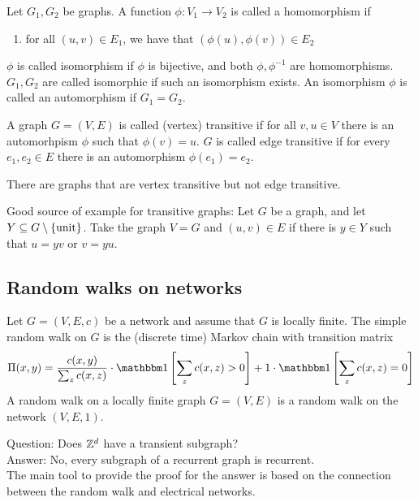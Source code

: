 \begin{defn}[Homomorphisms]
    Let $G_1,G_2$ be graphs. A function \(\phi: V_1 \to V_2\) is called a homomorphism if 
    \begin{enumerate}
      \item for all $(u,v) \in E_1$, we have that \((\phi(u), \phi(v)) \in E_2\)
    \end{enumerate}
    $\phi$ is called isomorphism if \(\phi\) is bijective, and both $\phi,\phi^{-1}$ are homomorphisms. $G_1,G_2$ are called isomorphic if such an isomorphism exists. An isomorphism $\phi$ is called an automorphism if $G_1=G_2$.
\end{defn}

\begin{defn}[Transitivity]
    A graph $G=(V,E)$ is called (vertex) transitive if for all \(v,u\in V\) there is an automorhpism \(\phi\) such that \(\phi(v)=u\). $G$ is called edge transitive if for every $e_1,e_2 \in E$ there is an automorphism $\phi(e_1)=e_2$.
\end{defn}

\begin{remark}
    There are graphs that are vertex transitive but not edge transitive.
\end{remark}

\begin{remark}
  Good source of example for transitive graphs: Let $G$ be a graph, and let $Y \subseteq G\setminus\left\{ {\textrm{unit}} \right\}$. Take the graph $V=G$ and $(u,v) \in E$ if there is $y\in Y$ such that $u=yv$ or $v=yu$.
\end{remark}


\subsection{Random walks on networks}

\begin{defn}
Let $G=(V,E,c)$ be a network and assume that $G$ is locally finite. The simple random walk on $G$ is the (discrete time) Markov chain with transition matrix
\[\Pi(x,y) = \frac{c(x,y)}{\sum_z c(x,z)} \cdot \ONE\left[\sum_z c(x,z) >0\right] + 1 \cdot \ONE\left[\sum_z c(x,z)=0\right] \]
A random walk on a locally finite graph $G=(V,E)$ is a random walk on the network $(V,E,1)$.
\end{defn}


\begin{remark}
    Question: Does \(\mathbb{Z}^d\) have a transient subgraph?\\
    Answer: No, every subgraph of a recurrent graph is recurrent. \\ 
    The main tool to provide the proof for the answer is based on the connection between the random walk and electrical networks.
\end{remark}



